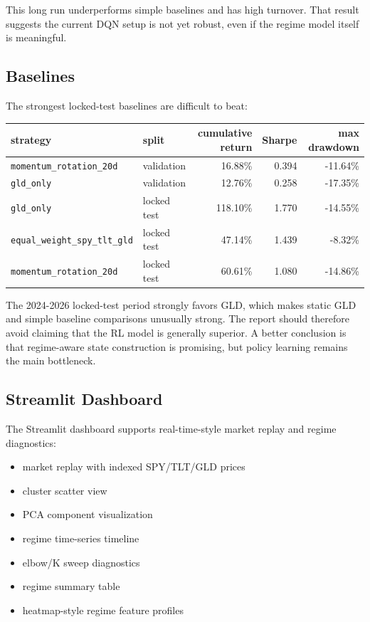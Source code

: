 This long run underperforms simple baselines and has high turnover. That
result suggests the current DQN setup is not yet robust, even if the
regime model itself is meaningful.

\subsection{Baselines}\label{baselines}

The strongest locked-test baselines are difficult to beat:

{\def\LTcaptype{none} %
\begin{longtable}[]{@{}llrrr@{}}
\toprule\noalign{}
strategy & split & cumulative return & Sharpe & max drawdown \\
\midrule\noalign{}
\endhead
\bottomrule\noalign{}
\endlastfoot
\texttt{momentum\_rotation\_20d} & validation & 16.88\% & 0.394 &
-11.64\% \\
\texttt{gld\_only} & validation & 12.76\% & 0.258 & -17.35\% \\
\texttt{gld\_only} & locked test & 118.10\% & 1.770 & -14.55\% \\
\texttt{equal\_weight\_spy\_tlt\_gld} & locked test & 47.14\% & 1.439 &
-8.32\% \\
\texttt{momentum\_rotation\_20d} & locked test & 60.61\% & 1.080 &
-14.86\% \\
\end{longtable}
}

The 2024-2026 locked-test period strongly favors GLD, which makes static
GLD and simple baseline comparisons unusually strong. The report should
therefore avoid claiming that the RL model is generally superior. A
better conclusion is that regime-aware state construction is promising,
but policy learning remains the main bottleneck.

\subsection{Streamlit Dashboard}\label{streamlit-dashboard}

The Streamlit dashboard supports real-time-style market replay and
regime diagnostics:

\begin{itemize}
\tightlist
\item
  market replay with indexed SPY/TLT/GLD prices
\item
  cluster scatter view
\item
  PCA component visualization
\item
  regime time-series timeline
\item
  elbow/K sweep diagnostics
\item
  regime summary table
\item
  heatmap-style regime feature profiles
\end{itemize}

